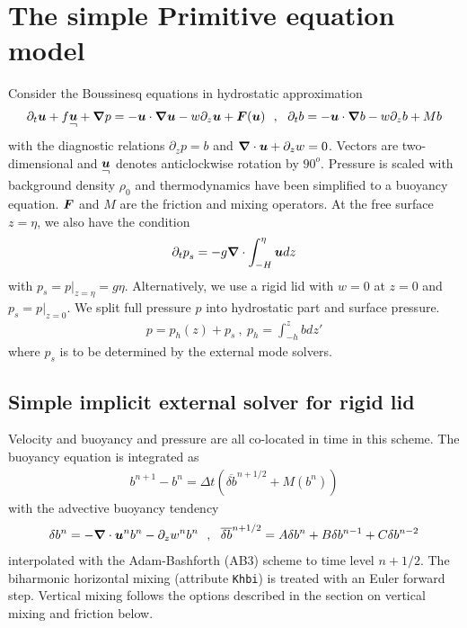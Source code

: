 \documentclass[12pt]{article}
\newcommand{\beq}  { \begin{eqnarray} }
\newcommand{\eeq}  { \end{eqnarray}}
\renewcommand{\v}[1]{{\mbox{\boldmath$ #1 $}}}  %
\newcommand{\pt}[1]{{\partial_t #1}}
\newcommand{\pz}[1]{{\partial_z #1}}
\newcommand{\Bar}[1]{ \overline{ #1} }
\newcommand{\rvec} [1]{
    \raisebox{-1.5ex}{$\stackrel{\textstyle #1}{\neg}$} }%
\newcommand{\p}{{\partial}}
\newcommand{\vn}{{\v \nabla}}
\newcommand{\lk}{\left(}
\newcommand{\rk}{\right)}
\begin{document}
 \section*{The simple Primitive equation model}

Consider the Boussinesq equations in hydrostatic approximation
\beq \label{eq1}
  \pt{\v u } +   f \rvec{\v u}  +   \vn p =   - \v u \cdot \vn \v u - w \pz{} \v u +  \v F( \v u)~~,~~
    \pt{b}   =  - \v u \cdot \vn b  - w \pz{} b +  M b
     \eeq
  with the diagnostic relations     $\pz p =b$ and $\vn \cdot \v u + \pz w =0$.
  Vectors are two-dimensional and $\rvec{\v u} $ denotes  anticlockwise
 rotation by $90^o$. 
  Pressure is scaled with background density $\rho_0$ and thermodynamics have been
  simplified to a buoyancy equation.
  $\v F$  and $M$ are the friction and mixing operators.
   At the free surface $z=\eta$, we also have the
      condition 
      \beq \pt p_s  = -   g \vn \cdot  \int_{-H}^\eta \v u dz 
       \eeq
  with $p_s = p|_{z=\eta} =  g \eta$.
  Alternatively, we use a rigid lid with $w=0$ at $z=0$
  and $p_s = p|_{z=0}$.
We split full pressure $p$ into hydrostatic part and surface pressure.
\beq
p = p_h(z) + p_s ~,~
p_h =  \int_{-h}^z b  dz'
\eeq
where  $p_s$ is to be determined by the external mode solvers.



\subsection*{Simple implicit external solver for rigid lid}

Velocity and buoyancy and pressure are all co-located in time in this scheme.
The buoyancy equation is integrated as
\beq
  b^{n+1}- b^n = \Delta t \lk  \Bar{\delta b}^{n+1/2} + M (b^{n})    \rk 
\eeq
with the advective buoyancy tendency
\beq
\delta b^n =  - \vn \cdot \v u^{n} b^n - \p_z w^{n} b^n ~~,~~
\Bar{ \delta b}^{n+1/2} = A \delta b^n + B \delta b^{n-1} + C \delta b^{n-2}
 \eeq
 interpolated with the Adam-Bashforth (AB3) scheme  to time level $n+1/2$.
 The biharmonic horizontal mixing (attribute \verb|Khbi|) is treated with an Euler forward step.
 Vertical mixing follows the options described in the section on vertical mixing and friction below.
 
\end{document}
